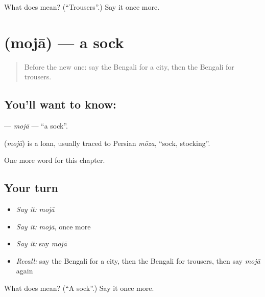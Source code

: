 \begin{tcolorbox}[breakable,colback=teal!4,colframe=teal!35!black,title={Before you move on}]
What does  mean? (\textquotedblleft{}Trousers\textquotedblright{}.) Say it once more.
\end{tcolorbox}
\section[\texorpdfstring{\bn{মোজা} (mojā)}{মোজা (mojā)}]{ (mojā) — a sock}

\label{lesson:BN-C85-moja}



\begin{quote}
Before the new one: say the Bengali for a city, then the Bengali for trousers.
\end{quote}

\subsection*{You'll want to know: }
\textbf{} — \emph{mojā} — \textquotedblleft{}a sock\textquotedblright{}.

\begin{cousinweb}
\textbf{} (\emph{mojā}) is a loan, usually traced to Persian \emph{mōza}, \textquotedblleft{}sock, stocking\textquotedblright{}.
\end{cousinweb}

\begin{grammarlens}[title={What you've built}]
One more word for this chapter.
\end{grammarlens}

\subsection*{Your turn}
\begin{itemize}
\raggedright
  \item \emph{Say it:} \emph{mojā}
  \item \emph{Say it:} \emph{mojā}, once more
  \item \emph{Say it:} say \emph{mojā}
  \item \emph{Recall:} say the Bengali for a city, then the Bengali for trousers, then say \emph{mojā} again
\end{itemize}

\begin{tcolorbox}[breakable,colback=teal!4,colframe=teal!35!black,title={Before you move on}]
What does  mean? (\textquotedblleft{}A sock\textquotedblright{}.) Say it once more.
\end{tcolorbox}
